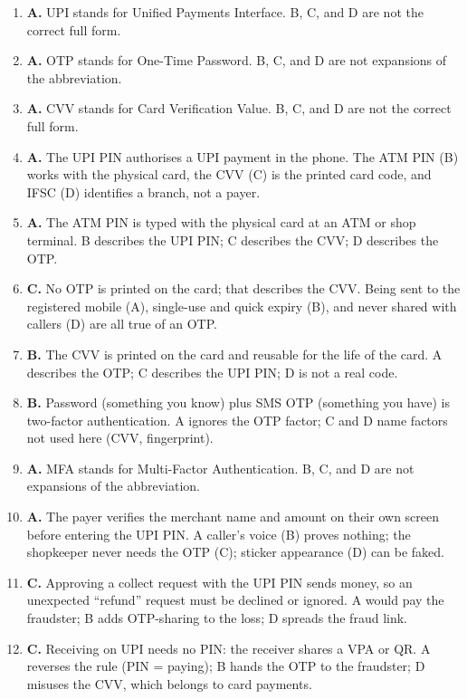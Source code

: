 \begin{enumerate}[label=\textbf{Q\arabic*.}, leftmargin=*]
\item \textbf{A.} UPI stands for Unified Payments Interface. B, C, and D
  are not the correct full form.
\item \textbf{A.} OTP stands for One-Time Password. B, C, and D are not
  expansions of the abbreviation.
\item \textbf{A.} CVV stands for Card Verification Value. B, C, and D are
  not the correct full form.
\item \textbf{A.} The UPI PIN authorises a UPI payment in the phone. The
  ATM PIN (B) works with the physical card, the CVV (C) is the printed card
  code, and IFSC (D) identifies a branch, not a payer.
\item \textbf{A.} The ATM PIN is typed with the physical card at an ATM or
  shop terminal. B describes the UPI PIN; C describes the CVV; D describes
  the OTP.
\item \textbf{C.} No OTP is printed on the card; that describes the CVV.
  Being sent to the registered mobile (A), single-use and quick expiry (B),
  and never shared with callers (D) are all true of an OTP.
\item \textbf{B.} The CVV is printed on the card and reusable for the life
  of the card. A describes the OTP; C describes the UPI PIN; D is not a
  real code.
\item \textbf{B.} Password (something you know) plus SMS OTP (something you
  have) is two-factor authentication. A ignores the OTP factor; C and D name
  factors not used here (CVV, fingerprint).
\item \textbf{A.} MFA stands for Multi-Factor Authentication. B, C, and D
  are not expansions of the abbreviation.
\item \textbf{A.} The payer verifies the merchant name and amount on their
  own screen before entering the UPI PIN. A caller's voice (B) proves
  nothing; the shopkeeper never needs the OTP (C); sticker appearance (D)
  can be faked.
\item \textbf{C.} Approving a collect request with the UPI PIN sends money,
  so an unexpected ``refund'' request must be declined or ignored. A would
  pay the fraudster; B adds OTP-sharing to the loss; D spreads the fraud
  link.
\item \textbf{C.} Receiving on UPI needs no PIN: the receiver shares a VPA
  or QR. A reverses the rule (PIN = paying); B hands the OTP to the
  fraudster; D misuses the CVV, which belongs to card payments.

\end{enumerate}
